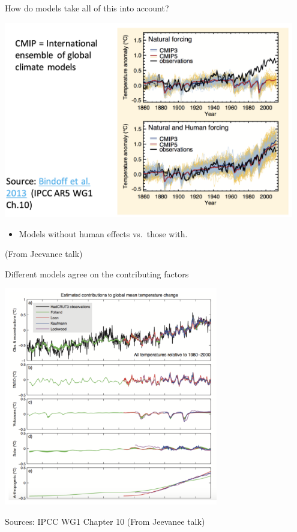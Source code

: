 \documentclass[12pt]{beamer}
\begin{document}
\begin{frame}{How do models take all of this into account?}

\begin{center}
\includegraphics[width=0.95\textwidth]{images/jeevanjee_models_slide7.png}
\end{center}
%



\begin{itemize}
\item Models without human effects vs.\ those with.
\end{itemize}
\vfill
{\tiny (From Jeevanee talk)}
\end{frame}
\begin{frame}{Different models agree on the contributing factors}

\begin{center}
\includegraphics[width=0.7\textwidth]{images/jeevanjee_models-agree_slide9.png}
\end{center}
%


\vfill
{\tiny Sources: IPCC WG1 Chapter 10 (From Jeevanee talk)}
\end{frame}
\end{document}
